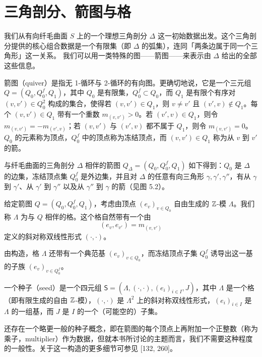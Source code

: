 \section{三角剖分、箭图与格}

我们从有向纤毛曲面 $S$ 上的一个理想三角剖分 $\Delta$ 这一初始数据出发。这个三角剖分提供的核心组合数据是一个有限集（即 $\Delta$ 的弧集），连同「两条边属于同一个三角形」这一关系。
我们可以用一类特殊的图——箭图——来表示由 $\Delta$ 给出的全部这些信息。

\begin{definition}[5.1]
箭图（quiver）是指无 1-循环与 2-循环的有向图。更确切地说，它是一个三元组 $Q=(Q_0,Q_0^f,Q_1)$，其中 $Q_0$ 是有限集，$Q_0^f\subset Q_0$，而 $Q_1$ 是有限个有序对 $(v,v')\in Q_0^2$ 构成的集合，使得若 $(v,v')\in Q_1$，则 $v\ne v'$ 且 $(v',v)\notin Q_1$。每个 $(v,v')\in Q_1$ 带有一个重数 $m_{(v,v')}>0$。若 $(v',v)\in Q_1$，则令 $m_{(v,v')}=-m_{(v',v)}$；若 $(v,v')$ 与 $(v',v)$ 都不属于 $Q_1$，则令 $m_{(v,v')}=0$。$Q_0$ 的元素称为顶点，$Q_0^f$ 中的顶点称为冻结顶点，而 $(v,v')\in Q_1$ 称为从 $v$ 到 $v'$ 的箭。
\end{definition}

与纤毛曲面的三角剖分 $\Delta$ 相伴的箭图 $Q_\Delta=(Q_0,Q_0^f,Q_1)$ 如下得到：$Q_0$ 是 $\Delta$ 的边集，冻结顶点集 $Q_0^f$ 是外边集，并且对 $\Delta$ 的任意有向三角形 $\gamma,\gamma',\gamma''$，有从 $\gamma$ 到 $\gamma'$、从 $\gamma'$ 到 $\gamma''$ 以及从 $\gamma''$ 到 $\gamma$ 的箭（见图 5.2）。


给定箭图 $Q=(Q_0,Q_0^f,Q_1)$，考虑由顶点 $(e_v)_{v\in Q_0}$ 自由生成的 $\mathbb{Z}$-模 $\Lambda$。我们称 $\Lambda$ 为与 $Q$ 相伴的格。这个格自然带有一个由
\[
(e_v,e_{v'})=m_{(v,v')}
\]
定义的斜对称双线性形式 $(\cdot,\cdot)$。

由构造，格 $\Lambda$ 还带有一个典范基 $(e_v)_{v\in Q_0}$，而冻结顶点子集 $Q_0^f$ 诱导出这一基的子族 $(e_v)_{v\in Q_0^f}$。

\begin{definition}[5.2]
一个种子（seed）是一个四元组 $\mathsf{S}=(\Lambda,(\cdot,\cdot),(e_i)_{i\in I},J)$，其中 $\Lambda$ 是一个格（即有限生成的自由 $\mathbb{Z}$-模），$(\cdot,\cdot)$ 是 $\Lambda^2$ 上的斜对称双线性形式，$(e_i)_{i\in I}$ 是 $\Lambda$ 的一组基，而 $J$ 是 $I$ 的一个（可能空的）子集。
\end{definition}

\begin{remark}[5.3]
还存在一个略更一般的种子概念，即在箭图的每个顶点上再附加一个正整数（称为乘子，multiplier）作为数据，但就本书所讨论的主题而言，我们不需要这种程度的一般性。关于这一构造的更多细节可参见 [132, 260]。
\end{remark}

